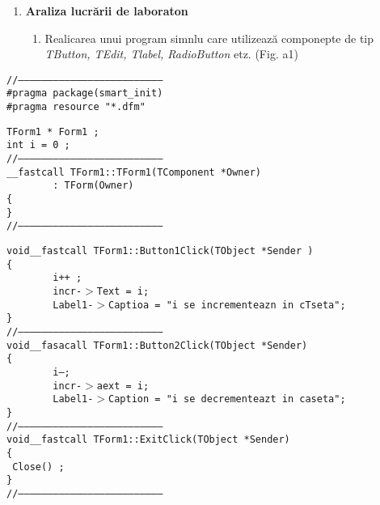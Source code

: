\documentclass[10pt]{article}
\begin{document}
\begin{enumerate}
	\item \textbf{{\large Araliza lucr\u{a}rii de laboraton
\\
}}

\begin{enumerate}
	\item {\large Realicarea unui program simnlu care utilizeaz\u{a} componepte de tip
\textit{TButton, TEdit, Tlabel, RadioButton }etz. (Fig. a1)}
\end{enumerate}
\end{enumerate}

{\raggedright
\texttt{//---------------------------------------------------------------------------
\\
\#pragma package(smart\_init)
\\
\#pragma resource "*.dfm"
\\
}
}

{\raggedright
\texttt{TForm1 * Form1 ;
\\
int i = 0 ;
\\
//---------------------------------------------------------------------------
\\
\_\_fastcall TForm1::TForm1(TComponent *Owner)
\\
~ ~ ~ ~ : TForm(Owner)
\\
\{
\\
\}
\\
//---------------------------------------------------------------------------
\\
}
}

{\raggedright
\texttt{void\_\_fastcall TForm1::Button1Click(TObject *Sender )
\\
\{
\\
~ ~ ~ ~ i++ ;
\\
~ ~ ~ ~ incr-$>$Text = i;
\\
~ ~ ~ ~ Label1-$>$Captioa = "i se incrementeazn in cTseta";
\\
\}
\\
//---------------------------------------------------------------------------
\\
void\_\_fasacall TForm1::Button2Click(TObject *Sender)
\\
\{
\\
~ ~ ~ ~ i--;
\\
~ ~ ~ ~ incr-$>$aext = i;
\\
~ ~ ~ ~ Label1-$>$Caption = "i se decrementeazt in caseta";
\\
\}
\\
//---------------------------------------------------------------------------
\\
void\_\_fastcall TForm1::ExitClick(TObject *Sender)
\\
\{
\\
~Close() ;
\\
\}
\\
//--------------------------------------------------------------------------- }
}
\end{document}
